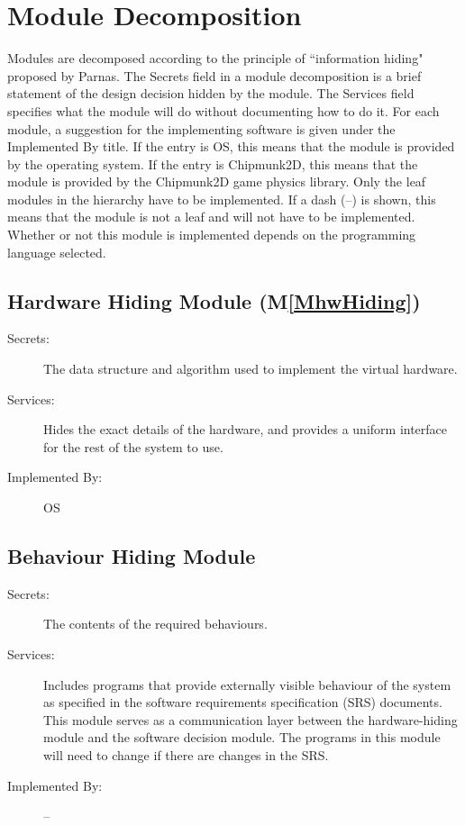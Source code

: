 \documentclass[12pt]{article}
\begin{document}
\section{Module Decomposition}
\label{Sec:ModuDeco}
Modules are decomposed according to the principle of ``information hiding" proposed by Parnas. The Secrets field in a module decomposition is a brief statement of the design decision hidden by the module. The Services field specifies what the module will do without documenting how to do it. For each module, a suggestion for the implementing software is given under the Implemented By title. If the entry is OS, this means that the module is provided by the operating system. If the entry is Chipmunk2D, this means that the module is provided by the Chipmunk2D game physics library. Only the leaf modules in the hierarchy have to be implemented. If a dash (--) is shown, this means that the module is not a leaf and will not have to be implemented. Whether or not this module is implemented depends on the programming language selected.
\subsection{Hardware Hiding Module (M\ref{MhwHiding})}
\label{Sec:HardHidiModu()}
\begin{description}
\item[Secrets:]The data structure and algorithm used to implement the virtual hardware.
\item[Services:]Hides the exact details of the hardware, and provides a uniform interface for the rest of the system to use.
\item[Implemented By:]OS
\end{description}
\subsection{Behaviour Hiding Module}
\label{Sec:BehaHidiModu}
\begin{description}
\item[Secrets:]The contents of the required behaviours.
\item[Services:]Includes programs that provide externally visible behaviour of the system as specified in the software requirements specification (SRS) documents. This module serves as a communication layer between the hardware-hiding module and the software decision module. The programs in this module will need to change if there are changes in the SRS.
\item[Implemented By:]--
\end{description}
\end{document}
